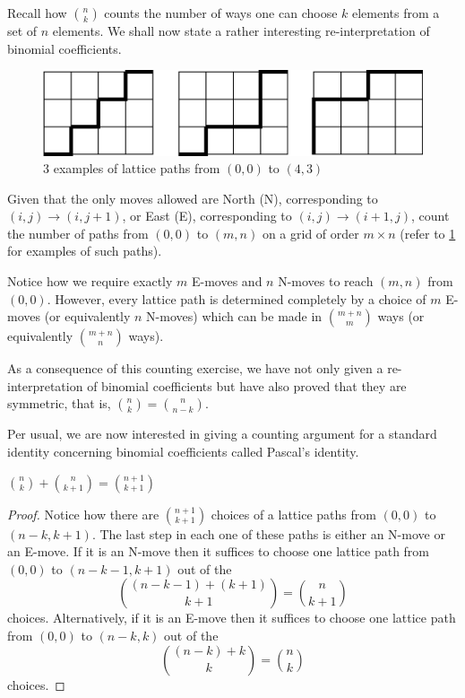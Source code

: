 Recall how $\binom{n}{k}$ counts the number of ways one can choose $k$ elements from a set of $n$ elements. We shall now state a rather interesting re-interpretation of binomial coefficients. 
\begin{figure}[H]
	\centering
	\includegraphics[scale=0.6]{Images/Figure8.png}
	\caption{$3$ examples of lattice paths from $\left( 0,0 \right)$ to $\left( 4,3 \right) $}
	\label{f:1.8}
\end{figure}
\begin{question}
Given that the only moves allowed are North (N), corresponding to $\left( i,j \right) \to \left( i,j+1 \right)$, or East (E), corresponding to $\left( i,j \right)\to \left( i+1,j \right)$, count the number of paths from $\left( 0,0 \right)$ to $\left( m,n \right)$ on a grid of order $m\times n$ (refer to \cref{f:1.8} for examples of such paths).
\label{q:1.8}
\end{question}
\begin{solution}
Notice how we require exactly $m$ E-moves and $n$ N-moves to reach $\left( m,n \right)$ from $\left( 0,0 \right)$. However, every lattice path is determined completely by a choice of $m$ E-moves (or equivalently $n$ N-moves) which can be made in $\binom{m+n}{m}$ ways (or equivalently $\binom{m+n}{n}$ ways).
\end{solution}
\begin{remark}
As a consequence of this counting exercise, we have not only given a re-interpretation of binomial coefficients but have also proved that they are symmetric, that is, $\binom{n}{k}=\binom{n}{n-k}$.
\label{r:1.2}
\end{remark}
Per usual, we are now interested in giving a counting argument for a standard identity concerning binomial coefficients called Pascal's identity.
\begin{claim}
$\binom{n}{k} + \binom{n}{k+1} = \binom{n+1}{k+1}$
\label{c:1.3}
\end{claim}
\begin{proof}
Notice how there are $\binom{n+1}{k+1}$ choices of a lattice paths from $\left( 0,0 \right)$ to $\left( n-k,k+1 \right)$. The last step in each one of these paths is either an N-move or an E-move. If it is an N-move then it suffices to choose one lattice path from $\left( 0,0 \right)$ to $\left( n-k-1,k+1 \right)$ out of the \[
\binom{\left( n-k-1 \right) + \left( k+1 \right)}{k+1} = \binom{n}{k+1}
\] choices. Alternatively, if it is an E-move then it suffices to choose one lattice path from $\left( 0,0 \right)$ to $\left( n-k,k \right)$ out of the \[
\binom{\left( n-k \right) + k}{k} = \binom{n}{k}\] choices.
\end{proof}
